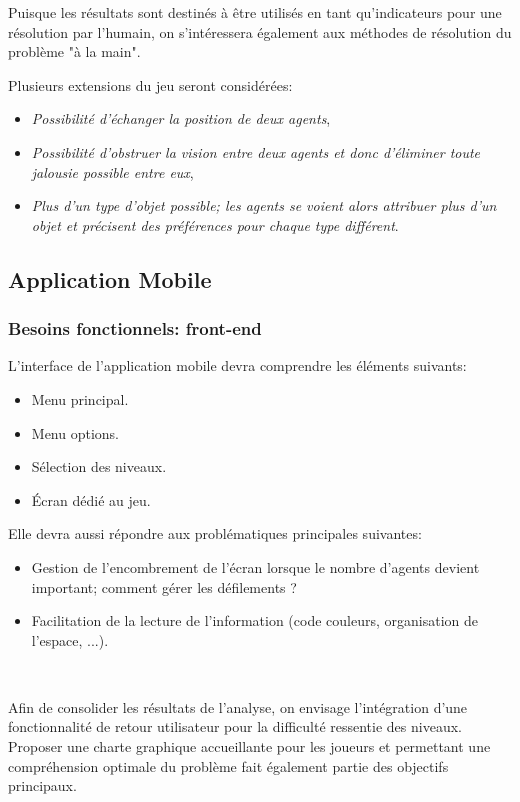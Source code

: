 \documentclass[a4paper, 11pt, titlepage]{article}
\begin{document}
\begin{appendix}
Puisque les résultats sont destinés à être utilisés en tant qu'indicateurs pour une résolution par l'humain, on s'intéressera également aux méthodes de résolution du problème "à la main".

Plusieurs extensions du jeu seront considérées:
\begin{itemize}
	\item \textit{Possibilité d’échanger la position de deux agents},
	\item \textit{Possibilité d’obstruer la vision entre deux agents et donc d’éliminer toute jalousie possible entre eux},
	\item \textit{Plus d’un type d’objet possible; les agents se voient alors attribuer plus d’un objet et précisent des préférences pour chaque type différent}.
\end{itemize}

\subsection{Application Mobile}

\label{sec:app}
\subsubsection{Besoins fonctionnels: front-end}
		
L’interface de l’application mobile devra comprendre les éléments suivants:
\begin{itemize}
	\item Menu principal.
	\item Menu options.
	\item Sélection des niveaux.
	\item Écran dédié au jeu.
\end{itemize}

Elle devra aussi répondre aux problématiques principales suivantes: 
\begin{itemize}
	\item Gestion de l’encombrement de l'écran lorsque le nombre d’agents devient important; comment gérer les défilements ?
	\item Facilitation de la lecture de l’information (code couleurs, organisation de l’espace, ...).
\end{itemize}\

Afin de consolider les résultats de l’analyse, on envisage l’intégration d’une fonctionnalité de retour utilisateur pour la difficulté ressentie des niveaux. Proposer une charte graphique accueillante pour les joueurs et permettant une compréhension optimale du problème fait également partie des objectifs principaux.


\end{appendix}
\end{document}
